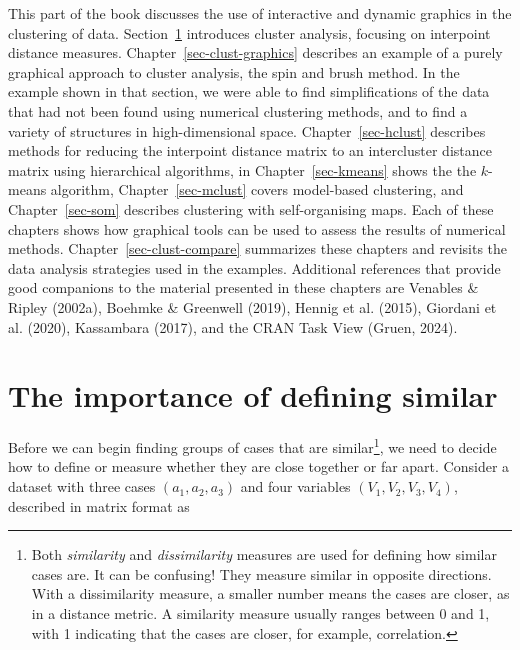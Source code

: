 \documentclass[
  letterpaper,
]{krantz}
\begin{document}
This part of the book discusses the use of interactive and dynamic
graphics in the clustering of data. Section~\ref{sec-clust-bg}
introduces cluster analysis, focusing on interpoint distance measures.
Chapter~\ref{sec-clust-graphics} describes an example of a purely
graphical approach to cluster analysis, the spin and brush method. In
the example shown in that section, we were able to find simplifications
of the data that had not been found using numerical clustering methods,
and to find a variety of structures in high-dimensional space.
Chapter~\ref{sec-hclust} describes methods for reducing the interpoint
distance matrix to an intercluster distance matrix using hierarchical
algorithms, in Chapter~\ref{sec-kmeans} shows the the \(k\)-means
algorithm, Chapter~\ref{sec-mclust} covers model-based clustering, and
Chapter~\ref{sec-som} describes clustering with self-organising maps.
Each of these chapters shows how graphical tools can be used to assess
the results of numerical methods. Chapter~\ref{sec-clust-compare}
summarizes these chapters and revisits the data analysis strategies used
in the examples. Additional references that provide good companions to
the material presented in these chapters are Venables \& Ripley (2002a),
Boehmke \& Greenwell (2019), Hennig et al. (2015), Giordani et al.
(2020), Kassambara (2017), and the CRAN Task View (Gruen, 2024).

\section{The importance of defining similar}\label{sec-clust-bg}

Before we can begin finding groups of cases that are similar\footnote{Both
  \emph{similarity} and \emph{dissimilarity} measures are used for
  defining how similar cases are. It can be confusing! They measure
  similar in opposite directions. With a dissimilarity measure, a
  smaller number means the cases are closer, as in a distance metric. A
  similarity measure usually ranges between 0 and 1, with 1 indicating
  that the cases are closer, for example, correlation.}, we need to
decide how to define or measure whether they are close together or far
apart. Consider a dataset with three cases \((a_1, a_2, a_3)\) and four
variables \((V_1, V_2, V_3, V_4)\), described in matrix format as
\end{document}
